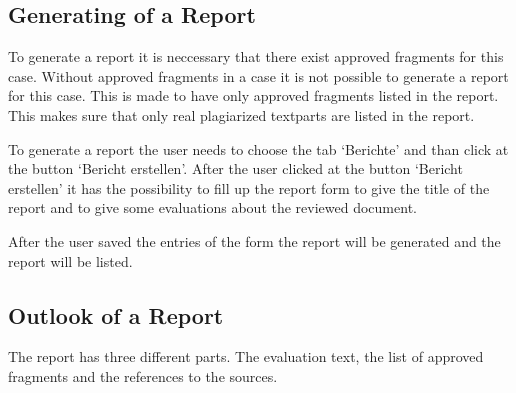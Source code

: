 \subsection{Generating of a Report}

To generate a report it is neccessary that there exist approved fragments for this case. Without approved fragments in a case it is not possible to generate a report for this case. 
This is made to have only approved fragments listed in the report. This makes sure that only real plagiarized textparts are listed in the report.

To generate a report the user needs to choose the tab `Berichte' and than click at the button `Bericht erstellen'. After the user clicked at the  button `Bericht erstellen' it has the possibility to fill up the report form to give the title of the report and to give some evaluations about the reviewed document.

After the user saved the entries of the form the report will be generated and the report will be listed.

\subsection{Outlook of a Report}

The report has three different parts. The evaluation text, the list of approved fragments and the references to the sources.
